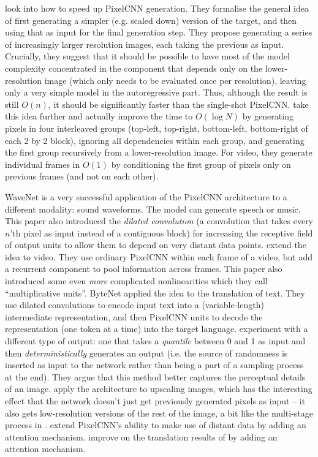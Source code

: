 \documentclass[10pt,a4paper]{article}
\newcommand{\nquote}[1]{``{#1}''}
\begin{document}
\cite{auxiliary} look into how to speed up PixelCNN generation. They formalise the general idea of first generating a simpler (e.g. scaled down) version of the target, and then using that as input for the final generation step. They propose generating a series of increasingly larger resolution images, each taking the previous as input. Crucially, they suggest that it should be possible to have most of the model complexity concentrated in the component that depends only on the lower-resolution image (which only needs to be evaluated once per resolution), leaving only a very simple model in the autoregressive part. Thus, although the result is still $O(n)$, it should be significantly faster than the single-shot PixelCNN. \cite{multiscale} take this idea further and actually improve the time to $O(\log N)$ by generating pixels in four interleaved groups (top-left, top-right, bottom-left, bottom-right of each 2 by 2 block), ignoring all dependencies within each group, and generating the first group recursively from a lower-resolution image. For video, they generate individual frames in $O(1)$ by conditioning the first group of pixels only on previous frames (and not on each other).

WaveNet \cite{wavenet} is a very successful application of the PixelCNN architecture to a different modality: sound waveforms. The model can generate speech or music. This paper also introduced the \emph{dilated convolution} (a convolution that takes every $n$'th pixel as input instead of a contiguous block) for increasing the receptive field of output units to allow them to depend on very distant data points. \cite{videopixel} extend the idea to video. They use ordinary PixelCNN within each frame of a video, but add a recurrent component to pool information across frames. This paper also introduced some even \emph{more} complicated nonlinearities which they call \nquote{multiplicative units}. ByteNet \cite{bytenet} applied the idea to the translation of text. They use dilated convolutions to encode input text into a (variable-length) intermediate representation, and then PixelCNN units to decode the representation (one token at a time) into the target language. \cite{quantile} experiment with a different type of output: one that takes a \emph{quantile} between 0 and 1 as input and then \emph{deterministically} generates an output (i.e. the source of randomness is inserted as input to the network rather than being a part of a sampling process at the end). They argue that this method better captures the perceptual details of an image. \cite{superres} apply the architecture to upscaling images, which has the interesting effect that the network doesn't just get previously generated pixels as input -- it also gets low-resolution versions of the rest of the image, a bit like the multi-stage process in \cite{pixelcnn1}. \cite{pixelsnail} extend PixelCNN's ability to make use of distant data by adding an attention mechanism. \cite{fbtranslate} improve on the translation results of \cite{bytenet} by adding an attention mechanism.
\end{document}
